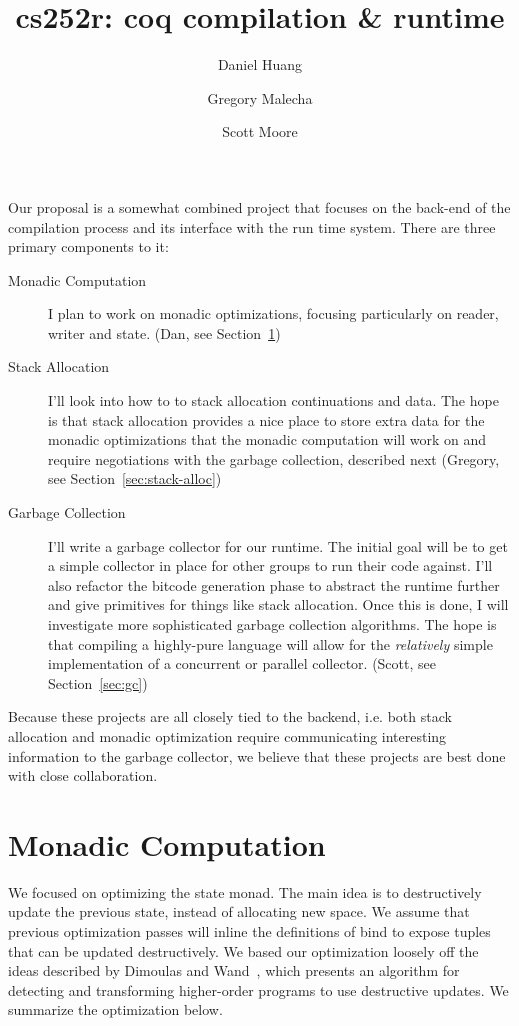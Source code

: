 \documentclass{article}
\title{cs252r: coq compilation \& runtime}
\author{Daniel Huang \and Gregory Malecha \and Scott Moore}
\begin{document}
\maketitle

Our proposal is a somewhat combined project that focuses on the back-end of the compilation process and its interface with the run time system. There are three primary components to it:

\begin{description}
\item[Monadic Computation] I plan to work on monadic optimizations,
  focusing particularly on reader, writer and state. (Dan, see Section~\ref{sec:mon-com})
\item[Stack Allocation] I'll look into how to to stack allocation continuations and data. The hope is that stack allocation provides a nice place to store extra data for the monadic optimizations that the monadic computation will work on and require negotiations with the garbage collection, described next (Gregory, see Section~\ref{sec:stack-alloc})
\item[Garbage Collection] I'll write a garbage collector for our runtime. The initial goal will be to get a simple collector in place for other groups to run their code against. I'll also refactor the bitcode generation phase to abstract the runtime further and give primitives for things like stack allocation. Once this is done, I will investigate more sophisticated garbage collection algorithms. The hope is that compiling a highly-pure language will allow for the \emph{relatively} simple implementation of a concurrent or parallel collector. (Scott, see Section~\ref{sec:gc})
\end{description} 

Because these projects are all closely tied to the backend, i.e. both stack allocation and monadic optimization require communicating interesting information to the garbage collector, we believe that these projects are best done with close collaboration.

\section{Monadic Computation}
\label{sec:mon-com}

We focused on optimizing the state monad. The main idea is to destructively update the previous state, instead of allocating new space. We assume that previous optimization passes will inline the definitions of bind to expose tuples that can be updated destructively. We based our optimization loosely off the ideas described by Dimoulas and Wand~\cite{dimoulas2009higher}, which presents an algorithm for detecting and transforming higher-order programs to use destructive updates. We summarize the optimization below. 
\end{document}
